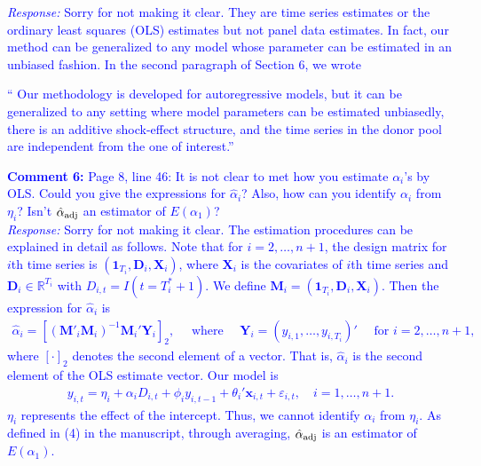 \documentclass[12pt]{article}
\newcommand{\R}{\mathbb{R}}
\newcommand{\response}[1]{\noindent \textcolor{blue}{\emph{Response:} #1}}
\begin{document}
\response{Sorry for not making it clear. They are time series estimates or the ordinary least squares (OLS) estimates but not panel data estimates. In fact, our method can be generalized to any model whose parameter can be estimated in an unbiased fashion. In the second paragraph of Section 6, we wrote \\


\begin{tcolorbox}
`` Our methodology is developed for autoregressive models, but it can be generalized to any setting  where model parameters can be estimated unbiasedly, there is an additive shock-effect structure, and the time series in the donor pool are independent from the one of interest.''
\end{tcolorbox}




{\bf Comment 6:} Page 8, line 46: It is not clear to met how you estimate $\alpha_i$'s by OLS. Could you give the expressions for $\hat{\alpha}_i$? Also, how can you identify $\alpha_i$ from $\eta_i$? Isn't $\hat{\alpha}_{\rm adj}$ an estimator of $E(\alpha_1)$? \\

\response{Sorry for not making it clear. The estimation procedures can be explained in detail as follows. Note that for $i = 2, \ldots, n+1$, the design matrix for $i$th time series is $(\mathbf{1}_{T_i}, \mathbf{D}_{i}, \mathbf{X}_{i})$, where $\mathbf{X}_i$ is the covariates  of $i$th time series and $\mathbf{D}_{i}\in\R^{T_i}$ with $D_{i,t}=I(t=T_i^*+1)$. We define $\mathbf{M}_i = (\mathbf{1}_{T_i}, \mathbf{D}_{i}, \mathbf{X}_{i})$. Then the expression for $\hat{\alpha}_i$ is
\begin{align*}
  \hat{\alpha}_i = [(\mathbf{M}'_i\mathbf{M}_i)^{-1}\mathbf{M}_i'\mathbf{Y}_{i}]_{2}, \quad 
  \text{ where }\quad \mathbf{Y}_{i}=(y_{i,1},\ldots,y_{i,T_i})' 
 \quad  \text{ for } i = 2, \ldots, n+1,
\end{align*}
where $[\cdot]_{2}$ denotes the second element of a vector. That is, $\hat{\alpha}_i$ is the second element of the OLS estimate vector. Our model is
\begin{align*}
  y_{i,t} = \eta_i + \alpha_i D_{i,t} + \phi_i y_{i,t-1} + \theta_i'\mathbf{x}_{i,t} + \varepsilon_{i,t}, 
  \quad i = 1, \ldots, n+1.
\end{align*}
$\eta_i$ represents the effect of the intercept. Thus, we cannot identify $\alpha_i$ from $\eta_i$. As defined in (4) in the manuscript, through averaging, $\hat{\alpha}_{\rm adj}$ is an estimator  of $E(\alpha_1)$.} \\


}
\end{document}
